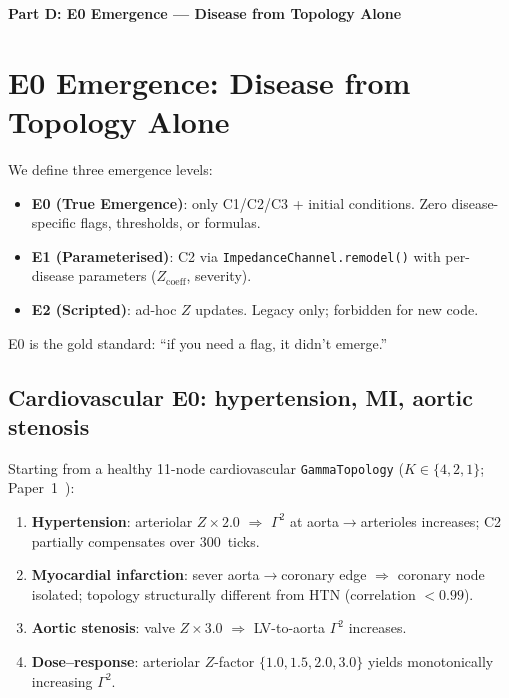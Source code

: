 \documentclass[aps,pre,twocolumn,superscriptaddress,floatfix]{revtex4-2}
\begin{document}
\bigskip\noindent\textbf{\large Part D: E0 Emergence ---
Disease from Topology Alone}
\label{part:D}
\bigskip


\section{E0 Emergence: Disease from Topology Alone}
\label{sec:e0-emergence}

We define three emergence levels:
\begin{itemize}
  \item \textbf{E0 (True Emergence)}: only C1/C2/C3
    + initial conditions.
    Zero disease-specific flags, thresholds, or
    formulas.
  \item \textbf{E1 (Parameterised)}: C2 via
    \texttt{ImpedanceChannel.remodel()} with
    per-disease parameters ($Z_{\text{coeff}}$,
    severity).
  \item \textbf{E2 (Scripted)}: ad-hoc $Z$ updates.
    Legacy only; forbidden for new code.
\end{itemize}

\noindent
E0 is the gold standard:
``if you need a flag, it didn't emerge.''


\subsection{Cardiovascular E0: hypertension, MI,
  aortic stenosis}
\label{sec:cardio-e0}

Starting from a healthy 11-node cardiovascular
\texttt{GammaTopology}
($K \in \{4, 2, 1\}$;
Paper~1~\cite{Paper1}):

\begin{enumerate}
  \item \textbf{Hypertension}: arteriolar
    $Z \times 2.0$ $\Rightarrow$ $\Gamma^2$ at
    aorta$\to$arterioles increases;
    C2 partially compensates over 300~ticks.
  \item \textbf{Myocardial infarction}: sever
    aorta$\to$coronary edge $\Rightarrow$
    coronary node isolated; topology structurally
    different from HTN (correlation $< 0.99$).
  \item \textbf{Aortic stenosis}: valve
    $Z \times 3.0$ $\Rightarrow$
    LV-to-aorta $\Gamma^2$ increases.
  \item \textbf{Dose--response}: arteriolar
    $Z$-factor $\{1.0, 1.5, 2.0, 3.0\}$ yields
    monotonically increasing $\Gamma^2$.
\end{enumerate}
\end{document}

